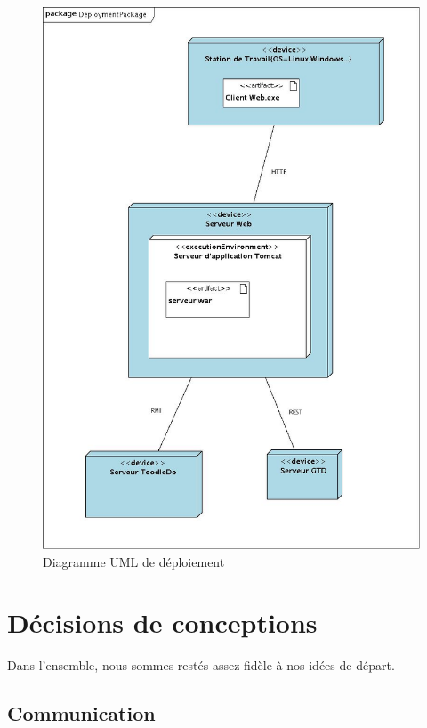 \begin{figure}[H]
\begin{center}
\includegraphics[scale=0.6]{livrable4/deploy.jpg}
\caption{Diagramme UML de déploiement}
\end{center}
\end{figure}



\chapter{Décisions de conceptions}

    Dans l'ensemble, nous sommes restés assez fidèle à nos idées de départ.

    \section{Communication}


